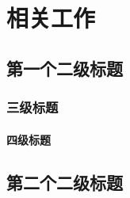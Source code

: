 \chapter{相关工作}
    \section{第一个二级标题}
        \subsection{三级标题}
            \subsubsection{四级标题}
    \section{第二个二级标题}